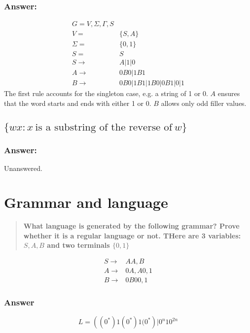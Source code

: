 \documentclass[titlepage]{article}\usepackage[]{graphicx}\usepackage[]{color}
\begin{document}
\subsubsection*{Answer:}

\begin{align*}
  G = {V, \Sigma, \Gamma, S} & \\
  V = & \{S, A\} \\
  \Sigma = & \{0,1\} \\
  S = & S \\
  S \to & A | 1 | 0 \\
  A \to & 0B0 | 1B1 \\
  B \to & 0B0 | 1B1 | 1B0 | 0B1 | 0 | 1
\end{align*} 
The first rule accounts for the singleton case, e.g. a string of 1
or 0. $A$ ensures that the word starts and ends with either 1 or 0. $B$ allows
only odd filler values. 

\subsection{\(\{wx : x \ \mbox{is a substring of the reverse of} \ w\}\)}
\subsubsection*{Answer:}
Unanswered.




\section{Grammar and language}
\begin{quote}
  \textbf{What language is generated by the following grammar?
    Prove whether it is a regular language or not. THere are 3 variables:
  \(S, A, B\) and two terminals \(\{0,1\}\) }
\end{quote}
\begin{align*}
  S \to& AA,B \\
  A \to& 0A, A0, 1 \\
  B \to& 0B00,1
\end{align*}
\subsubsection{Answer}

\[ L = \left( \left( 0^* \right)1\left( 0^* \right)1( 0^* \right) | 0^n 1 0^{2n} \]
\end{document}
